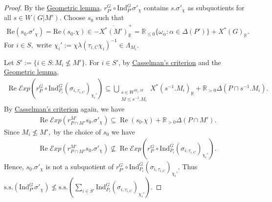 \documentclass[10pt]{amsart}
\theoremstyle{definition}
\numberwithin{equation}{section}
\numberwithin{equation}{subsection}
\newcommand{\Ind}{\mathrm{Ind}}
\newcommand{\RR}{\mathbb{R}}
\renewcommand{\Re}{\mathop{\mathrm{Re}}}
\begin{document}
\begin{proof}
     By the \hyperref[geometriclemma:2]{Geometric lemma}, $r^G_{P'}\circ \mathrm{Ind}_{P'}^G \sigma'_\chi$
     contains $s.\sigma'_\chi$ as subquotients for all $s\in W(G|M').$ Choose $s_0$ such that 
     \begin{align*}
         \mathrm{Re}(s_0.\sigma'_\chi)=\mathrm{Re}(s_0.\chi) \in -\overline{X^\ast(M')}_\RR^+= \mathbb{R}_{\leq 0}\{\omega_\alpha:\alpha\in \Delta(P')\} + X^*(G)_\RR.
     \end{align*}
     For $i\in S,$ write $\chi_i':=\chi\lambda(\tau_{i,C}\chi_i)^{-1}\in \Lambda_{M_i}.$ 

    Let $S':=\{ i\in S: M_i\not\le M'\}$. %
    For $i\in S'$, by \hyperref[CasselmanCriterion]{Casselman's criterion} and the \hyperref[geometriclemma:2]{Geometric lemma}, 
    \begin{align*}
        \Re \mathcal{E}xp\left( r_{P}^G\circ\mathrm{Ind}_{P_i}^G (\sigma_{i,\tau_{i,C}})_{\chi_i'}\right)\subseteq\bigcup_{\substack{s\in W^{M_i,M}\\ M\leq s^{-1}.M_i}} X^*(s^{-1}.M_i)_\RR+\RR_{>0}\Delta(P\cap s^{-1}.M_i).
    \end{align*} 
    By \hyperref[CasselmanCriterion]{Casselman's criterion} again, we have
    \begin{align*}
        \Re \mathcal{E}xp(r^{M'}_{P\cap M'} s_0.\sigma'_\chi) \subseteq \Re(s_0.\chi) + \mathbb{R}_{>0}\Delta(P\cap M').
    \end{align*}
    Since $M_i\not\le M',$ by the choice of $s_0$ we have
    \begin{align*}
    \Re \mathcal{E}xp(r^{M'}_{P\cap M'} s_0.\sigma'_\chi)\not\subseteq  \Re \mathcal{E}xp\left( r_{P}^G\circ\mathrm{Ind}_{P_i}^G (\sigma_{i,\tau_{i,C}})_{\chi_i'}\right).
    \end{align*}
    Hence, $s_0.\sigma'_\chi$ is not a subquotient of $r_{P'}^G\circ \Ind_{P_i}^G (\sigma_{i,\tau_{i,C}})_{\chi_i'}.$ Thus $\mathrm{s.s.}\left(\Ind_{P'}^G \sigma'_\chi\right)\not\le \mathrm{s.s.}\left(\sum_{i\in S'} \Ind_{P_i}^G (\sigma_{i,\tau_{i,C}})_{\chi_i'}\right).$
    

\end{proof}
\end{document}
